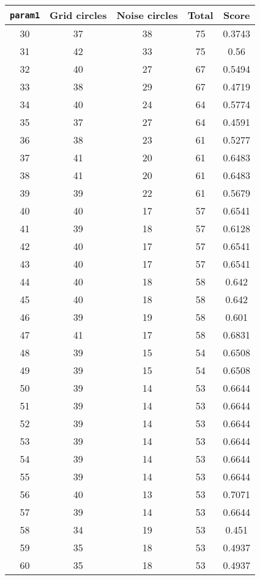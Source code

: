 \documentclass[letterpaper, 12pt]{article}
\begin{document}
\begin{longtable}{|c|c|c|c|c|}
\hline
\textbf{\texttt{param1}} & \textbf{Grid circles} & \textbf{Noise circles} & \textbf{Total} & \textbf{Score} \\
\hline
30 & 37 & 38 & 75 & 0.3743 \\
\hline
31 & 42 & 33 & 75 & 0.56 \\
\hline
32 & 40 & 27 & 67 & 0.5494 \\
\hline
33 & 38 & 29 & 67 & 0.4719 \\
\hline
34 & 40 & 24 & 64 & 0.5774 \\
\hline
35 & 37 & 27 & 64 & 0.4591 \\
\hline
36 & 38 & 23 & 61 & 0.5277 \\
\hline
37 & 41 & 20 & 61 & 0.6483 \\
\hline
38 & 41 & 20 & 61 & 0.6483 \\
\hline
39 & 39 & 22 & 61 & 0.5679 \\
\hline
40 & 40 & 17 & 57 & 0.6541 \\
\hline
41 & 39 & 18 & 57 & 0.6128 \\
\hline
42 & 40 & 17 & 57 & 0.6541 \\
\hline
43 & 40 & 17 & 57 & 0.6541 \\
\hline
44 & 40 & 18 & 58 & 0.642 \\
\hline
45 & 40 & 18 & 58 & 0.642 \\
\hline
46 & 39 & 19 & 58 & 0.601 \\
\hline
47 & 41 & 17 & 58 & 0.6831 \\
\hline
48 & 39 & 15 & 54 & 0.6508 \\
\hline
49 & 39 & 15 & 54 & 0.6508 \\
\hline
50 & 39 & 14 & 53 & 0.6644 \\
\hline
51 & 39 & 14 & 53 & 0.6644 \\
\hline
52 & 39 & 14 & 53 & 0.6644 \\
\hline
53 & 39 & 14 & 53 & 0.6644 \\
\hline
54 & 39 & 14 & 53 & 0.6644 \\
\hline
55 & 39 & 14 & 53 & 0.6644 \\
\hline
56 & 40 & 13 & 53 & 0.7071 \\
\hline
57 & 39 & 14 & 53 & 0.6644 \\
\hline
58 & 34 & 19 & 53 & 0.451 \\
\hline
59 & 35 & 18 & 53 & 0.4937 \\
\hline
60 & 35 & 18 & 53 & 0.4937 \\

\end{longtable}
\end{document}

